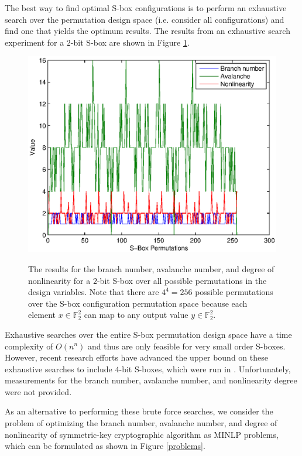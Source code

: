 \documentclass[11pt]{article}
\newcommand{\field}[1]{\mathbb{#1}} %
\begin{document}
The best way to find optimal S-box configurations is to perform an exhaustive search over the permutation design space (i.e. consider all configurations) and find one that yields the optimum results. The results from an exhaustive search experiment for a $2$-bit S-box are shown in Figure \ref{bfjoint}.
\begin{figure}[!ht]
	\centering
	\includegraphics[scale=0.65]{images/brute_joint.eps} \\
	\label{bfjoint}
	\caption{The results for the branch number, avalanche number, and degree of nonlinearity for a $2$-bit S-box over all possible permutations in the design variables. Note that there are $4^4 = 256$ possible permutations over the S-box configuration permutation space because each element $x \in \field{F}_2^2$ can map to any output value $y \in \field{F}_2^2$.}
\end{figure}
Exhaustive searches over the entire S-box permutation design space have a time complexity of $O(n^n)$ and thus are only feasible for very small order S-boxes. However, recent research efforts have advanced the upper bound on these exhaustive searches to include $4$-bit S-boxes, which were run in \cite{Sbox4x4}. Unfortunately, measurements for the branch number, avalanche number, and nonlinearity degree were not provided. 

As an alternative to performing these brute force searches, we consider the problem of optimizing the branch number, avalanche number, and degree of nonlinearity of symmetric-key cryptographic algorithm as MINLP problems, which can be formulated as shown in Figure \ref{problems}.
\end{document}
